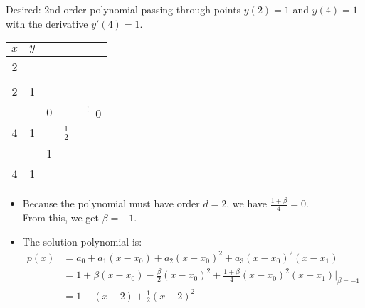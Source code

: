 Desired: 2nd order polynomial passing through points \(y(2)=1\) and \(y(4)=1\) with the derivative \(y'(4)=1\).

\begin{minipage}[c]{6cm}
	\renewcommand{\arraystretch}{1.0}
	\begin{tabular}{|c|llll|}
		\hline
		\(x\) & \multicolumn{4}{l|}{\(y\)} \\
		\hline
		2 & \kreisS{1}{\(a_0\)} & & & \\
		& & \kreisS{\(\beta\)}{\(a_1\)} & & \\
		2 & 1 & & \kreisB{\(-\frac \beta2\)}{\(a_2\)} & \\
		& & 0 & & \kreisB{\(\frac{1+\beta}{4}\)}{\(a_3\)}\(\overset{!}{=}0\) \\
		4 & 1 & & \(\frac 12\) & \\
		& & 1 & & \\
		4 & 1 & & & \\
		\hline
	\end{tabular}
	\renewcommand{\arraystretch}{1.5}
\end{minipage}
\hfill
\begin{minipage}[c]{12cm}

	\vspace{0.5cm}

	\begin{itemize}
		\item Because the polynomial must have order \(d=2\), we have \(\frac{1+\beta}4=0\).\\
		From this, we get \(\beta=-1\).
		\item The solution polynomial is:
		\begin{align*}
			p(x) &= a_0 + a_1(x-x_0) + a_2(x-x_0)^2 + a_3(x-x_0)^2(x-x_1) \\
			&= 1 + \beta(x-x_0) - \frac \beta2(x-x_0)^2 + \frac{1+\beta}4(x-x_0)^2(x-x_1)\big|_{\beta=-1} \\
			&= 1 - (x-2) + \frac 12(x-2)^2
		\end{align*}
	\end{itemize}
\end{minipage}

\vfill
